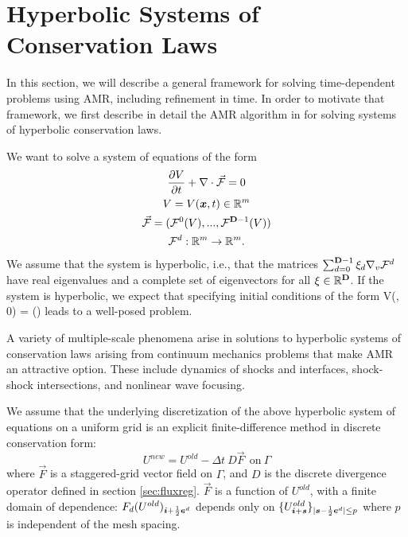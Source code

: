 \section{Hyperbolic Systems of Conservation Laws}
In this section, we will describe a general framework for solving
time-dependent problems using AMR, including refinement in time. In
order to motivate that framework, we first describe in detail 
the AMR algorithm in \cite{bergerColella:1989} for solving systems of
hyperbolic conservation laws.

We want to solve a system of equations of the form
\begin{gather*}
\frac{\partial V}{\partial t} + \nabla \cdot \vec{\mathcal{F}} = 0 \\
V = V({\boldsymbol{x}}, t) \in {\mathbb{R}}^m \\
\vec{\mathcal{F}} = ({\mathcal{F}}^0(V), ..., {\mathcal{F}}^{{\mathbf{D}}-1}(V)) \\
{\mathcal{F}}^d : {\mathbb{R}}^m \rightarrow {\mathbb{R}}^m .
\end{gather*}
We assume that the system is hyperbolic, i.e., that the matrices
$\sum^{{\mathbf{D}}-1}_{d=0} \xi_d \nabla_v {\mathcal{F}}^d$ have real
eigenvalues and a complete set of  eigenvectors for all ${\mathbf{\xi}}
\in {\mathbb{R}}^{\mathbf{D}}$. If the system is hyperbolic, we expect that 
specifying initial conditions of the form
\beqa
V(\xbold, 0) = \Psi(\xbold)
\eeqa
leads to a well-posed problem.

A variety of multiple-scale phenomena arise in solutions to hyperbolic
systems of conservation laws arising from continuum mechanics problems
that make AMR an attractive option.  These include dynamics of
shocks and interfaces, shock-shock intersections, and nonlinear wave
focusing.

We assume that the underlying discretization of the above hyperbolic
system of equations on a uniform grid
is an explicit finite-difference method in discrete conservation form:
\begin{equation*}
U^{new} = U^{old} - \Delta t ~ D\vec{F} ~~\text{on}~ \Gamma
\end{equation*}
where $\vec{F}$ is a staggered-grid vector field on $\Gamma$, and $D$
is the discrete divergence operator defined in section \ref{sec:fluxreg}.
$\vec{F}$ is a function of
$U^{old}$, with a finite domain of dependence:  $F_d(U^{old})_{{\boldsymbol{i}}
+ \frac{1}{2} {\boldsymbol{e}}^d}$ depends only on $\{ U^{old}_{{\boldsymbol{i}} + {\boldsymbol{s}}} \}_{|
{\boldsymbol{s}} - \frac{1}{2} {\boldsymbol{e}}^d | \leq p}$ where $p$ is independent of
the mesh spacing.

